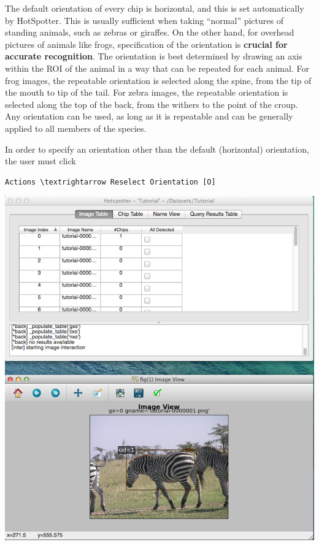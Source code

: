 \documentclass[a4paper,10pt]{article}
\begin{document}
        The default orientation of every chip is horizontal, and this is set
        automatically by HotSpotter.  This is usually sufficient when
        taking ``normal'' pictures of standing
        animals, such as zebras or giraffes.  On the other hand, for overhead
        pictures of animals like frogs, specification of the
        orientation is \textbf{crucial for accurate recognition}.  The
        orientation is best determined by drawing an axis within the
        ROI of the animal in a way that can be repeated for each
        animal.  For frog images, the repeatable orientation is selected along the spine, from the tip of the mouth to tip of the tail.  For zebra images, the repeatable orientation is 
	selected along the top of the back, from the withers to the point of the croup.  Any orientation can be used, as long as it is repeatable and can be generally applied to all members of the species.

 	\;
        
	In order to specify an orientation other than the default
        (horizontal) orientation, the user must click
        \begin{Verbatim}[commandchars=\\\{\}]
        Actions \textrightarrow Reselect Orientation [O]
        \end{Verbatim}
        \begin{center}
            \includegraphics[scale=0.13]{images/image.png}
        \end{center}
\end{document}

